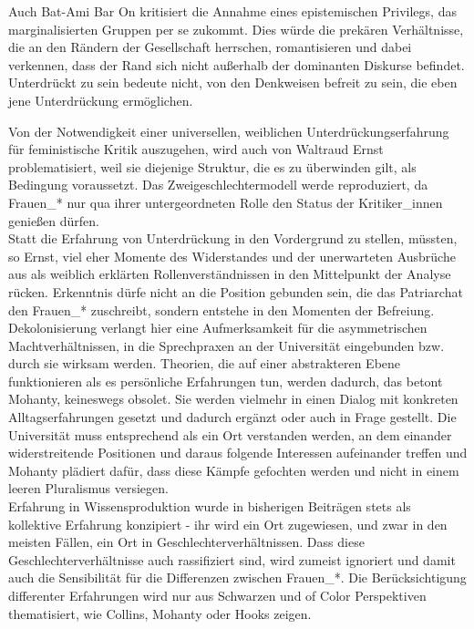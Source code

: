 Auch Bat-Ami Bar On kritisiert die Annahme eines epistemischen Privilegs, das
marginalisierten Gruppen per se zukommt. Dies würde die prekären Verhältnisse,
die an den Rändern der Gesellschaft herrschen, romantisieren und dabei
verkennen, dass der Rand sich nicht außerhalb der dominanten Diskurse befindet.
Unterdrückt zu sein bedeute nicht, von den Denkweisen befreit zu sein, die eben
jene Unterdrückung ermöglichen. \footnotemark {}

Von der Notwendigkeit einer universellen, weiblichen Unterdrückungserfahrung
für feministische Kritik auszugehen, wird auch von Waltraud Ernst
problematisiert, weil sie diejenige Struktur, die es zu überwinden gilt, als
Bedingung voraussetzt. Das Zweigeschlechtermodell werde reproduziert, da
Frauen\_* nur qua ihrer untergeordneten Rolle den Status der Kritiker\_innen
genießen dürfen. \\
Statt die Erfahrung von Unterdrückung in den Vordergrund zu
stellen, müssten, so Ernst, viel eher Momente des Widerstandes und der
unerwarteten Ausbrüche aus als weiblich erklärten Rollenverständnissen in den
Mittelpunkt der Analyse rücken. Erkenntnis dürfe nicht an die Position gebunden
sein, die das Patriarchat den Frauen\_* zuschreibt, sondern entstehe in den
Momenten der Befreiung.\footnotemark {} 
\\

Dekolonisierung verlangt hier eine
Aufmerksamkeit für die asymmetrischen Machtverhältnissen, in die Sprechpraxen
an der Universität eingebunden bzw. durch sie wirksam werden. Theorien, die auf
einer abstrakteren Ebene funktionieren als es persönliche Erfahrungen tun,
werden dadurch, das betont Mohanty, keineswegs obsolet. Sie werden vielmehr in
einen Dialog mit konkreten Alltagserfahrungen gesetzt und dadurch ergänzt oder
auch in Frage gestellt\footnotemark {}. Die Universität muss entsprechend als ein Ort verstanden
werden, an dem einander widerstreitende Positionen und daraus folgende
Interessen aufeinander treffen und Mohanty plädiert dafür, dass diese Kämpfe
gefochten werden und nicht in einem leeren Pluralismus versiegen.\\

Erfahrung in Wissensproduktion wurde in bisherigen Beiträgen stets als
kollektive Erfahrung konzipiert - ihr wird ein Ort zugewiesen, und zwar in den
meisten Fällen, ein Ort in Geschlechterverhältnissen. Dass diese
Geschlechterverhältnisse auch rassifiziert sind, wird zumeist ignoriert und
damit auch die Sensibilität für die Differenzen zwischen Frauen\_*. Die
Berücksichtigung differenter Erfahrungen wird nur aus Schwarzen und of Color
Perspektiven thematisiert, wie Collins, Mohanty oder Hooks zeigen.

